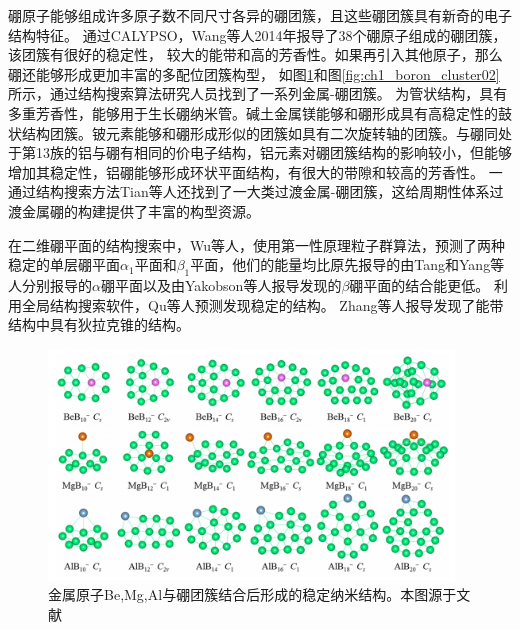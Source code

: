 硼原子能够组成许多原子数不同尺寸各异的硼团簇，且这些硼团簇具有新奇的电子结构特征。
通过CALYPSO，Wang等人\cite{lv2014b38}2014年报导了38个硼原子组成的硼团簇，该团簇有很好的稳定性，
较大的能带和高的芳香性。如果再引入其他原子，那么硼还能够形成更加丰富的多配位团簇构型\cite{lv2015stabilization}，
如图\ref{fig:ch1_boron_cluster01}和图\ref{fig:ch1_boron_cluster02}所示，通过结构搜索算法研究人员找到了一系列金属-硼团簇。
\cite{dong2019li}为管状结构，具有多重芳香性，能够用于生长硼纳米管。碱土金属镁能够和硼形成具有高稳定性的鼓状结构团簇\cite{tian2019exhaustive}。铍元素能够和硼形成形似的团簇如具有二次旋转轴的团簇\cite{kang2019probing}。与硼同处于第13族的铝与硼有相同的价电子结构，铝元素对硼团簇结构的影响较小，但能够增加其稳定性，铝硼能够形成环状平面结构\cite{jin2019structural}，有很大的带隙和较高的芳香性。
一通过结构搜索方法Tian等人\cite{tian2019cluster}还找到了一大类过渡金属-硼团簇，这给周期性体系过渡金属硼的构建提供了丰富的构型资源。

在二维硼平面的结构搜索中，Wu等人\cite{wu2012two}，使用第一性原理粒子群算法，预测了两种稳定的单层硼平面$\alpha_1$平面和$\beta_1$平面，他们的能量均比原先报导的由Tang和Yang等人\cite{tang2007novel,yang2008ab}分别报导的$\alpha$硼平面以及由Yakobson等人\cite{penev2012polymorphism}报导发现的$\beta$硼平面的结合能更低。
利用全局结构搜索软件，Qu等人\cite{qu2017two}预测发现稳定的结构。
Zhang等人\cite{zhang2017dirac}报导发现了能带结构中具有狄拉克锥的结构。

\begin{figure}[bt]
  \includegraphics[width=0.96\textwidth]{figs/ch1_boron_cluster01.png}
  \centering
  \caption{金属原子Be,Mg,Al与硼团簇结合后形成的稳定纳米结构。本图源于文献\cite{tian2019cluster}}
  \label{fig:ch1_boron_cluster01}
\end{figure}

